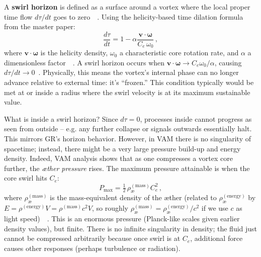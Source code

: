 \documentclass[a4paper,12pt]{article}
\begin{document}
    A \textbf{swirl horizon} is defined as a surface around a vortex where the local proper time flow $d\tau/dt$ goes to zero~\cite{reference_117}~\cite{reference_118}. Using the helicity-based time dilation formula from the master paper:
    \begin{equation}
        \frac{d\tau}{dt} = 1 - \alpha \frac{\mathbf{v}\cdot\boldsymbol{\omega}}{C_e\,\omega_0}\,,
        \label{eq:helicity-dilation}
    \end{equation}
    where $\mathbf{v}\cdot\boldsymbol{\omega}$ is the helicity density, $\omega_0$ a characteristic core rotation rate, and $\alpha$ a dimensionless factor~\cite{reference_119}~\cite{reference_120}. A swirl horizon occurs when $\mathbf{v}\cdot\boldsymbol{\omega} \to C_e \omega_0/\alpha$, causing $d\tau/dt \to 0$~\cite{reference_121}. Physically, this means the vortex’s internal phase can no longer advance relative to external time: it’s “frozen.” This condition typically would be met at or inside a radius where the swirl velocity is at its maximum sustainable value.

    What is inside a swirl horizon? Since $d\tau=0$, processes inside cannot progress as seen from outside – e.g. any further collapse or signals outwards essentially halt. This mirrors GR’s horizon behavior. However, in VAM there is no singularity of spacetime; instead, there might be a very large pressure build-up and energy density. Indeed, VAM analysis shows that as one compresses a vortex core further, the \emph{æther pressure} rises. The maximum pressure attainable is when the core swirl hits $C_e$:
    \begin{equation}
        P_{\max} = \tfrac{1}{2}\,\rho_{\text{\ae}}^{(\text{mass})} C_e^2\,,
        \label{eq:Pmax}
    \end{equation}
    where $\rho_{\text{\ae}}^{(\text{mass})}$ is the mass-equivalent density of the æther (related to $\rho_{\text{\ae}}^{(\text{energy})}$ by $E=\rho^{(\text{energy})}V = \rho^{(\text{mass})} c^2 V$, so roughly $\rho^{(\text{mass})}_{\text{\ae}} = \rho^{(\text{energy})}_{\text{\ae}}/c^2$ if we use $c$ as light speed)~\cite{reference_122}~\cite{reference_123}. This is an enormous pressure (Planck-like scales given earlier density values), but finite. There is no infinite singularity in density; the fluid just cannot be compressed arbitrarily because once swirl is at $C_e$, additional force causes other responses (perhaps turbulence or radiation).
\end{document}
